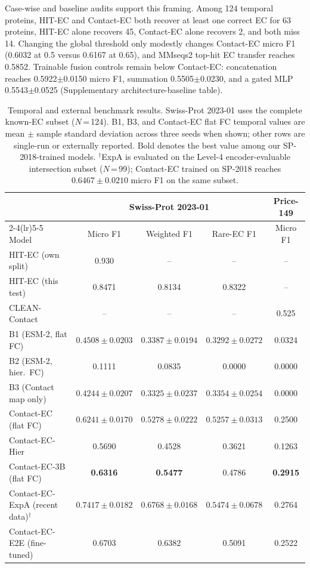 \documentclass[namedate,contemporary,mediumone]{oup-authoring-template}
\begin{document}
Case-wise and baseline audits support this framing. Among 124 temporal proteins,
HIT-EC and Contact-EC both recover at least one correct EC for 63 proteins,
HIT-EC alone recovers 45, Contact-EC alone recovers 2, and both miss 14.
Changing the global threshold only modestly changes Contact-EC micro F1 (0.6032
at 0.5 versus 0.6167 at 0.65), and MMseqs2 top-hit EC transfer reaches 0.5852.
Trainable fusion controls remain below Contact-EC: concatenation reaches
0.5922$\pm$0.0150 micro F1, summation 0.5505$\pm$0.0230, and a gated MLP
0.5543$\pm$0.0525 (Supplementary architecture-baseline table).

\begin{table}[htbp]
\centering
\caption{Temporal and external benchmark results. Swiss-Prot 2023-01 uses the
complete known-EC subset ($N$\,=\,124). B1, B3, and Contact-EC flat FC temporal
values are mean $\pm$ sample standard deviation across three seeds when shown;
other rows are single-run or externally reported. Bold denotes the best value among our
SP-2018-trained models. $^\dagger$ExpA is evaluated on the Level-4
encoder-evaluable intersection subset ($N$\,=\,99); Contact-EC trained on
SP-2018 reaches $0.6467\pm0.0210$ micro F1 on the same subset.}
\label{tab:main}
\scriptsize
\setlength{\tabcolsep}{3pt}
\begin{tabular}{lcccc}
\toprule
& \multicolumn{3}{c}{Swiss-Prot 2023-01} & Price-149 \\
\cmidrule(lr){2-4}\cmidrule(lr){5-5}
Model & Micro F1 & Weighted F1 & Rare-EC F1 & Micro F1 \\
\midrule
HIT-EC (own split)        & 0.930 & -- & -- & -- \\
HIT-EC (this test)        & 0.8471 & 0.8134 & 0.8322 & -- \\
CLEAN-Contact             & -- & -- & -- & 0.525 \\
\midrule
B1 (ESM-2, flat FC)       & $0.4508\pm0.0203$ & $0.3387\pm0.0194$ & $0.3292\pm0.0272$ & 0.0324 \\
B2 (ESM-2, hier.\ FC)     & 0.1111 & 0.0835 & 0.0000 & 0.0000 \\
B3 (Contact map only)     & $0.4244\pm0.0207$ & $0.3325\pm0.0237$ & $0.3354\pm0.0254$ & 0.0000 \\
Contact-EC (flat FC)      & $0.6241\pm0.0170$ & $0.5278\pm0.0222$ & $\mathbf{0.5257\pm0.0313}$ & 0.2500 \\
Contact-EC-Hier           & 0.5690 & 0.4528 & 0.3621 & 0.1263 \\
Contact-EC-3B (flat FC)   & \textbf{0.6316} & \textbf{0.5477} & 0.4786 & \textbf{0.2915} \\
\midrule
Contact-EC-ExpA (recent data)$^\dagger$ & $0.7417\pm0.0182$ & $0.6768\pm0.0168$ & $0.5474\pm0.0678$ & 0.2764 \\
Contact-EC-E2E (fine-tuned)   & 0.6703 & 0.6382 & 0.5091 & 0.2522 \\
\bottomrule
\end{tabular}
\end{table}
\end{document}
